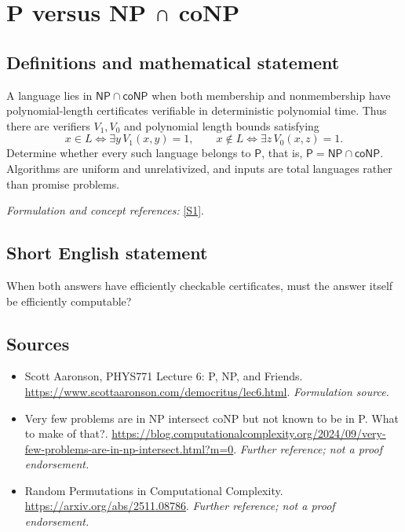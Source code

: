 \documentclass[11pt]{article}
\begin{document}
\section*{\texorpdfstring{P versus NP ∩ coNP}{P versus NP ∩ coNP}}\label{statement}
\subsection{Definitions and mathematical statement}
A language lies in $\mathsf{NP}\cap\mathsf{coNP}$ when both membership and nonmembership have polynomial-length certificates verifiable in deterministic polynomial time. Thus there are verifiers $V_1,V_0$ and polynomial length bounds satisfying
\[
 x\in L\iff\exists y\,V_1(x,y)=1,\qquad
 x\notin L\iff\exists z\,V_0(x,z)=1.
\]
Determine whether every such language belongs to $\mathsf P$, that is, $\mathsf P=\mathsf{NP}\cap\mathsf{coNP}$. Algorithms are uniform and unrelativized, and inputs are total languages rather than promise problems.
\par\smallskip\textit{Formulation and concept references:} \href{https://www.scottaaronson.com/democritus/lec6.html}{[S1]}.

\subsection{Short English statement}
When both answers have efficiently checkable certificates, must the answer itself be efficiently computable?
\subsection{Sources}
\begin{itemize}
\item[S1]Scott Aaronson, PHYS771 Lecture 6: P, NP, and Friends.
\url{https://www.scottaaronson.com/democritus/lec6.html}.
\textit{Formulation source.}
\item[S2]Very few problems are in NP intersect coNP but not known to be in P. What to make of that?.
\url{https://blog.computationalcomplexity.org/2024/09/very-few-problems-are-in-np-intersect.html?m=0}.
\textit{Further reference; not a proof endorsement.}
\item[S3]Random Permutations in Computational Complexity.
\url{https://arxiv.org/abs/2511.08786}.
\textit{Further reference; not a proof endorsement.}
\end{itemize}
\end{document}
